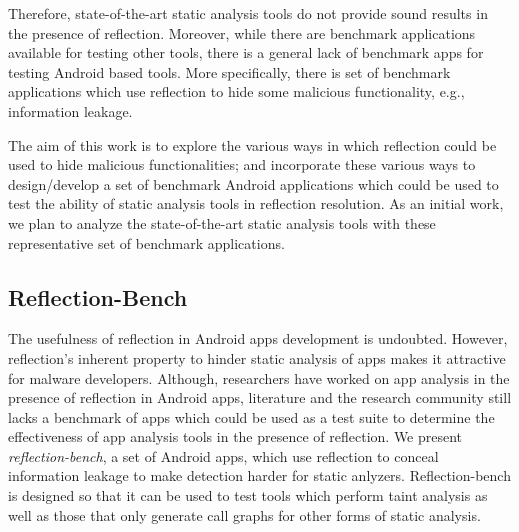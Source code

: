 Therefore, state-of-the-art static analysis tools do not provide sound results in the presence of reflection. Moreover, while there are benchmark applications available for testing other tools, there is a general lack of benchmark apps for testing Android based tools. More specifically, there is  set of benchmark applications which use reflection to hide some malicious functionality, e.g., information leakage.  

The aim of this work is to explore the various ways in which reflection could be used to hide malicious functionalities; and incorporate these various ways to design/develop a set of benchmark Android applications which could be used to test the ability of static analysis tools in reflection resolution. As an initial work, we plan to analyze the state-of-the-art static analysis tools with these representative set of benchmark applications. \fi


\subsection{Reflection-Bench}
\label{refbench}

The usefulness of reflection in Android apps development is undoubted. However, reflection's inherent property to hinder static analysis of apps makes it attractive for malware developers. Although, researchers have worked on app analysis in the presence of reflection in Android apps, literature and the research community still lacks a benchmark of apps which could be used as a test suite to determine the effectiveness of app analysis tools in the presence of reflection. We present \emph{reflection-bench}, a set of Android apps, which use reflection to conceal information leakage to make detection harder for static anlyzers. Reflection-bench is designed so that it can be used to test tools which perform taint analysis as well as those that only generate call graphs for other forms of static analysis.



\iffalse
\begin{itemize}
  \item Model
  \todo[inline]{A basic high level picture}
  \item Design and Implementation
  \todo[inline]{Design and implementation details of individual apps in the benchmark}
  \item State-of-the-art Static analysis tools
  \todo[inline]{Overview of tools considered for analysis}
  \item Analysis results
  \todo[inline]{Results of the analysis tools on individual apps in the benchmark}
\end{itemize}
\fi

